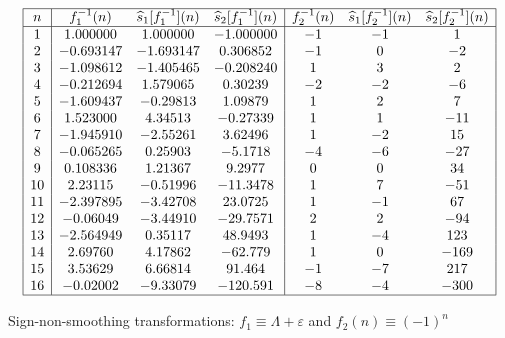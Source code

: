 \documentclass[12pt,reqno,a4letter]{article}
\numberwithin{figure}{section}
\numberwithin{table}{section}
\numberwithin{equation}{section}
\theoremstyle{plain}
\numberwithin{theorem}{section}
\theoremstyle{definition}
\begin{document}
\begin{table}[h!]
\begin{equation*}
\begin{array}{|c|ccc|ccc|} 
 \hline
 n & f_1^{-1}(n) & \widehat{s}_1[f_1^{-1}](n) & \widehat{s}_2[f_1^{-1}](n) & 
     f_2^{-1}(n) & \widehat{s}_1[f_2^{-1}](n) & 
     \widehat{s}_2[f_2^{-1}](n) \\ \hline
 1 & 1.000000 & 1.000000 & -1.000000 & -1 & -1 & 1 \\
 2 & -0.693147 & -1.693147 & 0.306852 & -1 & 0 & -2 \\
 3 & -1.098612 & -1.405465 & -0.208240 & 1 & 3 & 2 \\
 4 & -0.212694 & 1.579065 & 0.30239 & -2 & -2 & -6 \\
 5 & -1.609437 & -0.29813 & 1.09879 & 1 & 2 & 7 \\
 6 & 1.523000 & 4.34513 & -0.27339 & 1 & 1 & -11 \\
 7 & -1.945910 & -2.55261 & 3.62496 & 1 & -2 & 15 \\
 8 & -0.065265 & 0.25903 & -5.1718 & -4 & -6 & -27 \\
 9 & 0.108336 & 1.21367 & 9.2977 & 0 & 0 & 34 \\
 10 & 2.23115 & -0.51996 & -11.3478 & 1 & 7 & -51 \\
 11 & -2.397895 & -3.42708 & 23.0725 & 1 & -1 & 67 \\
 12 & -0.06049 & -3.44910 & -29.7571 & 2 & 2 & -94 \\
 13 & -2.564949 & 0.35117 & 48.9493 & 1 & -4 & 123 \\
 14 & 2.69760 & 4.17862 & -62.779 & 1 & 0 & -169 \\
 15 & 3.53629 & 6.66814 & 91.464 & -1 & -7 & 217 \\
 16 & -0.02002 & -9.33079 & -120.591 & -8 & -4 & -300 \\
 \hline
\end{array}
\end{equation*}
\caption{Sign-non-smoothing transformations: $f_1 \equiv \Lambda + \varepsilon$ and $f_2(n) \equiv (-1)^n$}
\label{table_s12Hatfn_SignSmoothingTF_v4}
\end{table}
\end{document}
